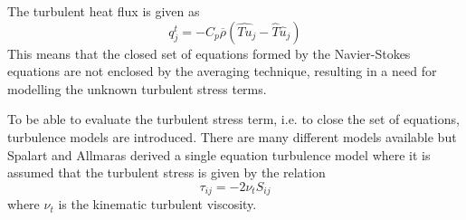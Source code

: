 The turbulent heat flux is given as
\begin{equation}
  q_j^t = -C_p\overline{\rho}\left(\widehat{Tu}_j-\hat{T}\hat{u}_j\right) \label{eq:FavreEnd}
\end{equation}
This means that the closed set of equations formed by the Navier-Stokes equations are not enclosed by the averaging technique, resulting in a need for modelling the unknown turbulent stress terms.

To be able to evaluate the turbulent stress term, i.e. to close the set of equations, turbulence models are introduced. There are many different models available but Spalart and Allmaras \cite{SA} derived a single equation turbulence model where it is assumed that the turbulent stress is given by the relation 
\begin{equation}
  \tau_{ij} = -2\nu_t{S}_{ij}
\end{equation}
where $\nu_t$ is the kinematic turbulent viscosity.

